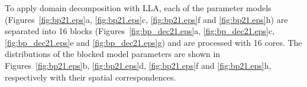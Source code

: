 \documentclass[manuscript,ulem,graphix,revised]{geophysics}
\begin{document}

To apply domain decomposition with LLA, each of the parameter models (Figures~\ref{fig:bp21.eps}a, \ref{fig:bp21.eps}c, \ref{fig:bp21.eps}f and \ref{fig:bp21.eps}h) are separated into 16 blocks (Figures~\ref{fig:bp_dec21.eps}a, \ref{fig:bp_dec21.eps}c, \ref{fig:bp_dec21.eps}e and \ref{fig:bp_dec21.eps}g) and are processed with 16 cores. 
The distributions of the blocked model parameters are shown in Figures~\ref{fig:bp21.eps}b, \ref{fig:bp21.eps}d, \ref{fig:bp21.eps}f and \ref{fig:bp21.eps}h, respectively with their spatial correspondences. 
\end{document}
